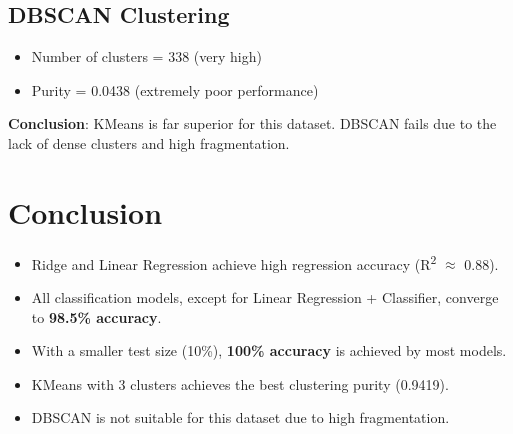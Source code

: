 \documentclass{article}
\begin{document}
\subsection*{DBSCAN Clustering}
\begin{itemize}
    \item Number of clusters = 338 (very high)
    \item Purity = 0.0438 (extremely poor performance)
\end{itemize}

\textbf{Conclusion}: KMeans is far superior for this dataset. DBSCAN fails due to the lack of dense clusters and high fragmentation.

\section{Conclusion}
\begin{itemize}
    \item Ridge and Linear Regression achieve high regression accuracy (R\textsuperscript{2} $\approx$ 0.88).
    \item All classification models, except for Linear Regression + Classifier, converge to \textbf{98.5\% accuracy}.
    \item With a smaller test size (10\%), \textbf{100\% accuracy} is achieved by most models.
    \item KMeans with 3 clusters achieves the best clustering purity (0.9419).
    \item DBSCAN is not suitable for this dataset due to high fragmentation.
\end{itemize}
\end{document}

